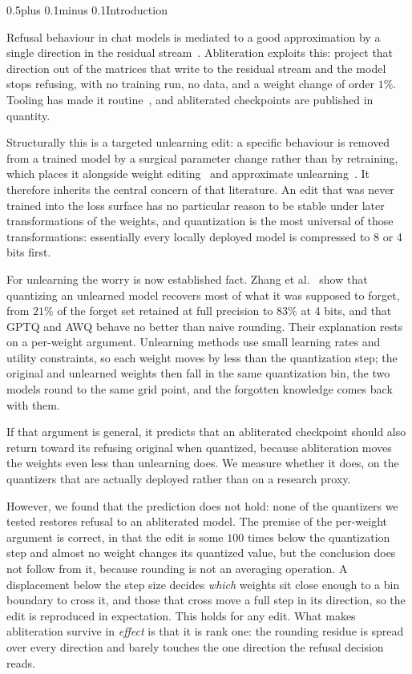 \documentclass[conference,compsoc,letterpaper]{IEEEtran}
\makeatletter
\def\section{\@startsection{section}{1}{\z@}{1\baselineskip plus 0.25\baselineskip minus 0.25\baselineskip}%
{0.5\baselineskip plus 0.1\baselineskip minus 0.1\baselineskip}{\normalfont\large\bfseries}}%
\makeatother
\begin{document}
\section{Introduction} \label{sec:intro}

Refusal behaviour in chat models is mediated to a good approximation by a single direction in the residual stream~\cite{arditi2024refusal}. Abliteration exploits this: project that direction out of the matrices that write to the residual stream and the model stops refusing, with no training run, no data, and a weight change of order $1\%$. Tooling has made it routine~\cite{heretic2025}, and abliterated checkpoints are published in quantity.

Structurally this is a targeted unlearning edit: a specific behaviour is removed from a trained model by a surgical parameter change rather than by retraining, which places it alongside weight editing~\cite{rome2022,memit2023} and approximate unlearning~\cite{unlearn2023}. It therefore inherits the central concern of that literature. An edit that was never trained into the loss surface has no particular reason to be stable under later transformations of the weights, and quantization is the most universal of those transformations: essentially every locally deployed model is compressed to 8 or 4 bits first.

For unlearning the worry is now established fact. Zhang et al.~\cite{zhang2025unlearnquant} show that quantizing an unlearned model recovers most of what it was supposed to forget, from $21\%$ of the forget set retained at full precision to $83\%$ at 4 bits, and that GPTQ and AWQ behave no better than naive rounding. Their explanation rests on a per-weight argument. Unlearning methods use small learning rates and utility constraints, so each weight moves by less than the quantization step; the original and unlearned weights then fall in the same quantization bin, the two models round to the same grid point, and the forgotten knowledge comes back with them.

If that argument is general, it predicts that an abliterated checkpoint should also return toward its refusing original when quantized, because abliteration moves the weights even less than unlearning does. We measure whether it does, on the quantizers that are actually deployed rather than on a research proxy.

However, we found that the prediction does not hold: none of the quantizers we tested restores refusal to an abliterated model. The premise of the per-weight argument is correct, in that the edit is some $100$ times below the quantization step and almost no weight changes its quantized value, but the conclusion does not follow from it, because rounding is not an averaging operation. A displacement below the step size decides \emph{which} weights sit close enough to a bin boundary to cross it, and those that cross move a full step in its direction, so the edit is reproduced in expectation. This holds for any edit. What makes abliteration survive in \emph{effect} is that it is rank one: the rounding residue is spread over every direction and barely touches the one direction the refusal decision reads.
\end{document}
